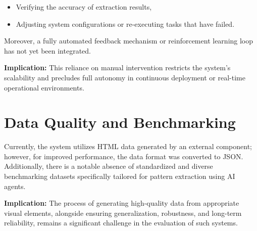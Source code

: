 \begin{itemize}
    \item Verifying the accuracy of extraction results,
    \item Adjusting system configurations or re-executing tasks that have failed.
\end{itemize}

Moreover, a fully automated feedback mechanism or reinforcement learning loop has not yet been integrated.

\noindent
\textbf{Implication:} This reliance on manual intervention restricts the system’s scalability and precludes full autonomy in continuous deployment or real-time operational environments.




\section{Data Quality and Benchmarking}
Currently, the system utilizes HTML data generated by an external component; however, for improved performance, the data format was converted to JSON. Additionally, there is a notable absence of standardized and diverse benchmarking datasets specifically tailored for pattern extraction using AI agents.

\noindent
\textbf{Implication:} The process of generating high-quality data from appropriate visual elements, alongside ensuring generalization, robustness, and long-term reliability, remains a significant challenge in the evaluation of such systems.










